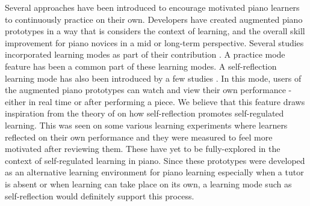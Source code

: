 \documentclass[sigconf, screen, review]{acmart}
\begin{document}
Several approaches have been introduced to encourage motivated piano learners to continuously practice on their own. Developers have created augmented piano prototypes in a way that is considers the context of learning, and the overall skill improvement for piano novices in a mid or long-term perspective. Several studies incorporated learning modes as part of their contribution \cite{xiao2011duet, das2017music, molloy2019mixed, xu20195}. A practice mode feature has been a common part of these learning modes. A self-reflection learning mode has also been introduced by a few studies \cite{gerry2019adept, xu20195, xiao2013mirrorfugue}. In this mode, users of the augmented piano prototypes can watch and view their own performance - either in real time or after performing a piece. We believe that this feature draws inspiration from the theory of \citet{zimmerman2009self} on how self-reflection promotes self-regulated learning. This was seen on some various learning experiments \cite{deja2016discovering,lyons2011monitoring} where learners reflected on their own performance and they were measured to feel more motivated after reviewing them. These have yet to be fully-explored in the context of self-regulated learning in piano.  Since these prototypes were developed as an alternative learning environment for piano learning especially when a tutor is absent or when learning can take place on its own, a learning mode such as self-reflection would definitely support this process. 
\end{document}
